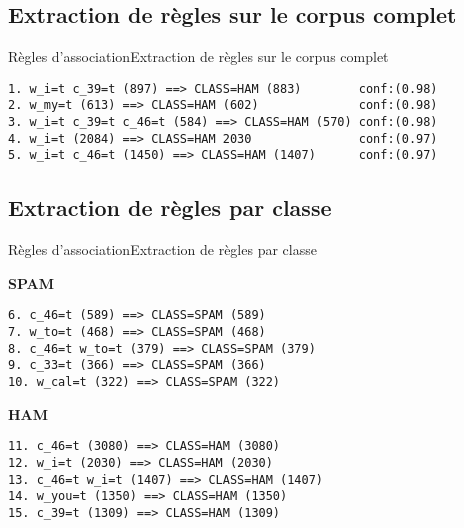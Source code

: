 \subsection{Extraction de règles sur le corpus complet}

\begin{frame}[containsverbatim]{Règles d'association}{Extraction de règles sur le corpus complet}
\scriptsize
\begin{verbatim}
1. w_i=t c_39=t (897) ==> CLASS=HAM (883)        conf:(0.98)
2. w_my=t (613) ==> CLASS=HAM (602)              conf:(0.98)
3. w_i=t c_39=t c_46=t (584) ==> CLASS=HAM (570) conf:(0.98)
4. w_i=t (2084) ==> CLASS=HAM 2030               conf:(0.97)
5. w_i=t c_46=t (1450) ==> CLASS=HAM (1407)      conf:(0.97)
\end{verbatim}
\end{frame}

\subsection{Extraction de règles par classe}

\begin{frame}[containsverbatim]{Règles d'association}{Extraction de règles par classe}

\textbf{SPAM}
\scriptsize
\begin{verbatim}
6. c_46=t (589) ==> CLASS=SPAM (589)             
7. w_to=t (468) ==> CLASS=SPAM (468)             
8. c_46=t w_to=t (379) ==> CLASS=SPAM (379)      
9. c_33=t (366) ==> CLASS=SPAM (366)             
10. w_cal=t (322) ==> CLASS=SPAM (322)           
\end{verbatim}

\normalsize
\textbf{HAM}
\scriptsize
\begin{verbatim}
11. c_46=t (3080) ==> CLASS=HAM (3080)           
12. w_i=t (2030) ==> CLASS=HAM (2030)            
13. c_46=t w_i=t (1407) ==> CLASS=HAM (1407)     
14. w_you=t (1350) ==> CLASS=HAM (1350)          
15. c_39=t (1309) ==> CLASS=HAM (1309)           
\end{verbatim}

\end{frame}
